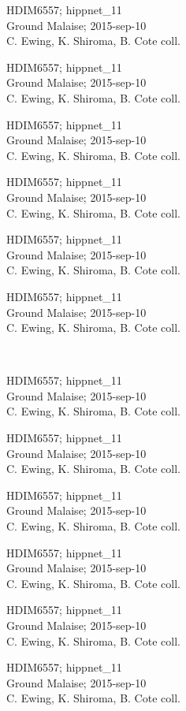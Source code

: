 \documentclass[2pt]{extarticle}
\begin{document}
\noindent
\parbox{0.16\textwidth}{\tiny \raggedright \rule[-0.3\baselineskip]{0pt}{10pt}HDIM6557; hippnet\_11\\ Ground Malaise; 2015-sep-10\\ C. Ewing, K. Shiroma, B. Cote coll.}
\parbox{0.16\textwidth}{\tiny \raggedright \rule[-0.3\baselineskip]{0pt}{10pt}HDIM6557; hippnet\_11\\ Ground Malaise; 2015-sep-10\\ C. Ewing, K. Shiroma, B. Cote coll.}
\parbox{0.16\textwidth}{\tiny \raggedright \rule[-0.3\baselineskip]{0pt}{10pt}HDIM6557; hippnet\_11\\ Ground Malaise; 2015-sep-10\\ C. Ewing, K. Shiroma, B. Cote coll.}
\parbox{0.16\textwidth}{\tiny \raggedright \rule[-0.3\baselineskip]{0pt}{10pt}HDIM6557; hippnet\_11\\ Ground Malaise; 2015-sep-10\\ C. Ewing, K. Shiroma, B. Cote coll.}
\parbox{0.16\textwidth}{\tiny \raggedright \rule[-0.3\baselineskip]{0pt}{10pt}HDIM6557; hippnet\_11\\ Ground Malaise; 2015-sep-10\\ C. Ewing, K. Shiroma, B. Cote coll.}
\parbox{0.16\textwidth}{\tiny \raggedright \rule[-0.3\baselineskip]{0pt}{10pt}HDIM6557; hippnet\_11\\ Ground Malaise; 2015-sep-10\\ C. Ewing, K. Shiroma, B. Cote coll.} \\ 
\vspace{0.001in} 

\noindent
\parbox{0.16\textwidth}{\tiny \raggedright \rule[-0.3\baselineskip]{0pt}{10pt}HDIM6557; hippnet\_11\\ Ground Malaise; 2015-sep-10\\ C. Ewing, K. Shiroma, B. Cote coll.}
\parbox{0.16\textwidth}{\tiny \raggedright \rule[-0.3\baselineskip]{0pt}{10pt}HDIM6557; hippnet\_11\\ Ground Malaise; 2015-sep-10\\ C. Ewing, K. Shiroma, B. Cote coll.}
\parbox{0.16\textwidth}{\tiny \raggedright \rule[-0.3\baselineskip]{0pt}{10pt}HDIM6557; hippnet\_11\\ Ground Malaise; 2015-sep-10\\ C. Ewing, K. Shiroma, B. Cote coll.}
\parbox{0.16\textwidth}{\tiny \raggedright \rule[-0.3\baselineskip]{0pt}{10pt}HDIM6557; hippnet\_11\\ Ground Malaise; 2015-sep-10\\ C. Ewing, K. Shiroma, B. Cote coll.}
\parbox{0.16\textwidth}{\tiny \raggedright \rule[-0.3\baselineskip]{0pt}{10pt}HDIM6557; hippnet\_11\\ Ground Malaise; 2015-sep-10\\ C. Ewing, K. Shiroma, B. Cote coll.}
\parbox{0.16\textwidth}{\tiny \raggedright \rule[-0.3\baselineskip]{0pt}{10pt}HDIM6557; hippnet\_11\\ Ground Malaise; 2015-sep-10\\ C. Ewing, K. Shiroma, B. Cote coll.} \\ 
\vspace{0.001in} 
\end{document}
